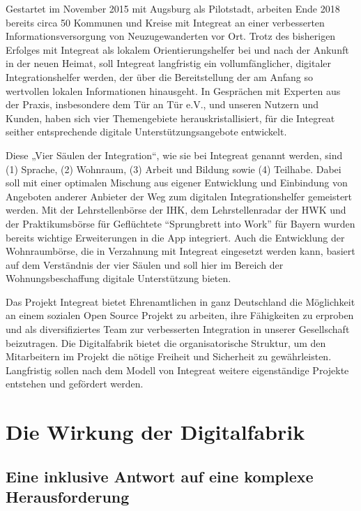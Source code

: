 \documentclass[12pt, a4paper]{article} %
\begin{document}
Gestartet im November 2015 mit Augsburg als Pilotstadt, arbeiten Ende
2018 bereits circa 50 Kommunen und Kreise mit Integreat an einer
verbesserten Informationsversorgung von Neuzugewanderten vor Ort. Trotz
des bisherigen Erfolges mit Integreat als lokalem Orientierungshelfer
bei und nach der Ankunft in der neuen Heimat, soll Integreat langfristig
ein vollumfänglicher, digitaler Integrationshelfer werden, der über die
Bereitstellung der am Anfang so wertvollen lokalen Informationen
hinausgeht. In Gesprächen mit Experten aus der Praxis, insbesondere dem
Tür an Tür e.V., und unseren Nutzern und Kunden, haben sich vier
Themengebiete herauskristallisiert, für die Integreat seither
entsprechende digitale Unterstützungsangebote entwickelt.

Diese „Vier Säulen der Integration“, wie sie bei Integreat genannt
werden, sind (1) Sprache, (2) Wohnraum, (3) Arbeit und Bildung sowie (4)
Teilhabe. Dabei soll mit einer optimalen Mischung aus eigener
Entwicklung und Einbindung von Angeboten anderer Anbieter der Weg zum
digitalen Integrationshelfer gemeistert werden. Mit der Lehrstellenbörse
der IHK, dem Lehrstellenradar der HWK und der Praktikumsbörse für
Geflüchtete “Sprungbrett into Work” für Bayern wurden bereits wichtige
Erweiterungen in die App integriert. Auch die Entwicklung der
Wohnraumbörse, die in Verzahnung mit Integreat eingesetzt werden kann,
basiert auf dem Verständnis der vier Säulen und soll hier im Bereich der
Wohnungsbeschaffung digitale Unterstützung bieten.

Das Projekt Integreat bietet Ehrenamtlichen in ganz Deutschland die
Möglichkeit an einem sozialen Open Source Projekt zu arbeiten, ihre
Fähigkeiten zu erproben und als diversifiziertes Team zur verbesserten
Integration in unserer Gesellschaft beizutragen. Die Digitalfabrik
bietet die organisatorische Struktur, um den Mitarbeitern im Projekt die
nötige Freiheit und Sicherheit zu gewährleisten. Langfristig sollen nach
dem Modell von Integreat weitere eigenständige Projekte entstehen und
gefördert werden.

\hypertarget{die-wirkung-der-digitalfabrik}{%
\section{Die Wirkung der
Digitalfabrik}\label{die-wirkung-der-digitalfabrik}}

\hypertarget{eine-inklusive-antwort-auf-eine-komplexe-herausforderung}{%
\subsection{Eine inklusive Antwort auf eine komplexe
Herausforderung}\label{eine-inklusive-antwort-auf-eine-komplexe-herausforderung}}
\end{document}

